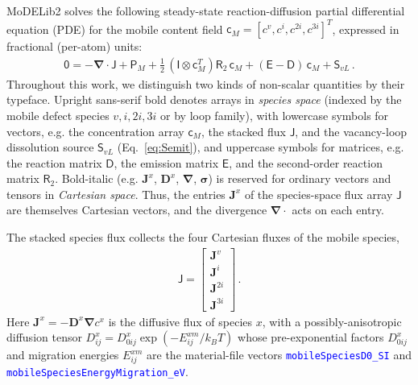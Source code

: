 \documentclass{article}
\newcommand{\textttclr}[1]{\textcolor{blue}{\texttt{#1}}}
\newcommand{\spvec}[1]{\bm{\mathsf{#1}}}   %
\newcommand{\spmat}[1]{\bm{\mathsf{#1}}}   %
\begin{document}
MoDELib2 solves the following steady-state reaction-diffusion partial differential equation (PDE) for the mobile content field $\spvec{c}_M=[c^v,c^i,c^{2i},c^{3i}]^T$, expressed in fractional (per-atom) units:
\begin{align}
\label{Eq:master_c}
    \spvec{0} = - \bm \nabla \cdot
\spvec{J}
+ \spvec{P}_{M}+\tfrac{1}{2}\,(\spmat{I}\otimes\spvec{c}_M^T)\spmat{R}_2\,\spvec{c}_{M}
+ (\spmat{E}-\spmat{D})\,\spvec{c}_{M}+\spvec{S}_{vL}\, .
\end{align}
Throughout this work, we distinguish two kinds of non-scalar quantities by their typeface. Upright sans-serif bold denotes arrays in \emph{species space} (indexed by the mobile defect species $v,i,2i,3i$ or by loop family), with lowercase symbols for vectors, e.g. the concentration array $\spvec{c}_M$, the stacked flux $\spvec{J}$, and the vacancy-loop dissolution source $\spvec{S}_{vL}$ (Eq.~\ref{eq:Semit}), and uppercase symbols for matrices, e.g. the reaction matrix $\spmat{D}$, the emission matrix $\spmat{E}$, and the second-order reaction matrix $\spmat{R}_2$. Bold-italic (e.g. $\bm J^x$, $\bm D^x$, $\bm\nabla$, $\bm\sigma$) is reserved for ordinary vectors and tensors in \emph{Cartesian space}. Thus, the entries $\bm J^x$ of the species-space flux array $\spvec{J}$ are themselves Cartesian vectors, and the divergence $\bm\nabla\cdot$ acts on each entry.

The stacked species flux collects the four Cartesian fluxes of the mobile species,
\begin{align}\label{eq:Jdef}
\spvec{J}=\begin{bmatrix}
 \bm{J}^v \\
 \bm{J}^i \\
 \bm{J}^{2i} \\
 \bm{J}^{3i}
\end{bmatrix}\, .
\end{align}
Here $\bm J^x =-\bm D^x\bm\nabla c^x$ is the diffusive flux of species $x$, with a possibly-anisotropic diffusion tensor $D^x_{ij}=D^x_{0ij}\exp(-E^{xm}_{ij}/k_BT)$ whose pre-exponential factors $D^x_{0ij}$ and migration energies $E^{xm}_{ij}$ are the material-file vectors \textttclr{mobileSpeciesD0\_SI} and \textttclr{mobileSpeciesEnergyMigration\_eV}. 
\end{document}
